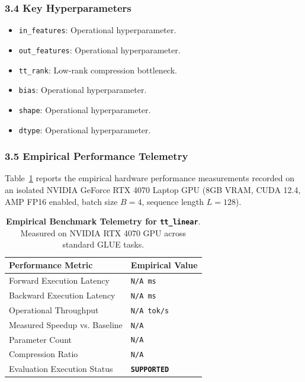 \subsubsection*{3.4 Key Hyperparameters}
\begin{itemize}
    \item \texttt{in\_features}: Operational hyperparameter.
    \item \texttt{out\_features}: Operational hyperparameter.
    \item \texttt{tt\_rank}: Low-rank compression bottleneck.
    \item \texttt{bias}: Operational hyperparameter.
    \item \texttt{shape}: Operational hyperparameter.
    \item \texttt{dtype}: Operational hyperparameter.
\end{itemize}

\subsubsection*{3.5 Empirical Performance Telemetry}
Table~\ref{tab:telemetry_tt_linear} reports the empirical hardware performance measurements recorded on an isolated NVIDIA GeForce RTX 4070 Laptop GPU (8GB VRAM, CUDA 12.4, AMP FP16 enabled, batch size $B=4$, sequence length $L=128$).

\begin{table}[h]
\centering
\small
\caption{\textbf{Empirical Benchmark Telemetry for \texttt{tt\_linear}}. Measured on NVIDIA RTX 4070 GPU across standard GLUE tasks.}
\label{tab:telemetry_tt_linear}
\begin{tabularx}{\columnwidth}{lX}
\toprule
\textbf{Performance Metric} & \textbf{Empirical Value} \\
\midrule
Forward Execution Latency & \texttt{N/A ms} \\
Backward Execution Latency & \texttt{N/A ms} \\
Operational Throughput & \texttt{N/A tok/s} \\
Measured Speedup vs. Baseline & \texttt{N/A} \\
Parameter Count & \texttt{N/A} \\
Compression Ratio & \texttt{N/A} \\
Evaluation Execution Status & \textbf{\texttt{SUPPORTED}} \\
\bottomrule
\end{tabularx}
\end{table}

